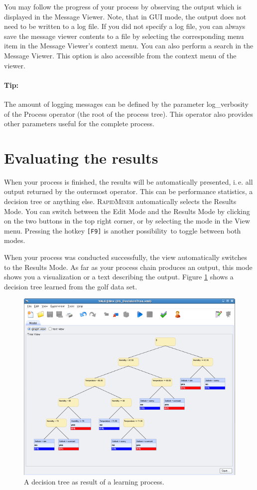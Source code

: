 \documentclass[11pt]{article}
\newcommand{\key}[1]{\texttt{[#1]}}
\newcommand{\useroption}[1]{\textsf{#1}}
\newcommand{\rapidminer}{\protect \textsc{RapidMiner}\xspace}
\begin{document}
You may follow the progress of your process by observing the output
which is displayed in the Message Viewer. Note, that in GUI mode, the
output does not need to be written to a log file. If you did not
specify a log file, you can always save the message viewer contents to
a file by selecting the corresponding menu item in the Message
Viewer's context menu. You can also perform a search in the Message
Viewer. This option is also accessible from the context menu of the
viewer.

\paragraph{Tip:}
The amount of logging messages can be defined by the parameter
\useroption{log\_verbosity} of the Process operator (the root of the
process tree). This operator also provides other parameters useful
for the complete process.





\section{Evaluating the results}

When your process is finished, the results will be automatically presented,
i.\,e. all output returned by the outermost operator. This can
be performance statistics, a decision tree or anything else. \rapidminer
automatically selects the \useroption{Results Mode}.
You can switch between the \useroption{Edit Mode} and the \useroption{Results Mode}
by clicking on the two buttons in the top right corner, or by selecting the mode
in the View menu. Pressing the hotkey \key{F9} is another possibility to toggle
between both modes.

When your process was conducted successfully, the view
automatically switches to the \useroption{Results Mode}. As far as your
process chain produces an output, this mode shows you a
visualization or a text describing the output. Figure
\ref{fig:screenshot_tree} shows a decision tree learned from the golf
data set.
\begin{figure}[ht]
\center
\includegraphics[width=0.88\linewidth]{decision_tree.png}
\caption{A decision tree as result of a learning process.}
\label{fig:screenshot_tree}
\end{figure}
\end{document}
